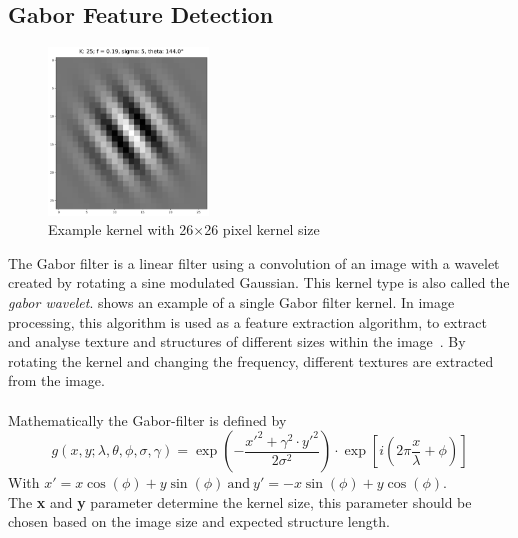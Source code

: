 \documentclass[12pt,a4paper, english,twoside]{scrartcl}
\begin{document}
    \subsection{Gabor Feature Detection}\label{sec:gabor}
      \begin{figure}
      \vspace{-1cm}
       \begin{center}
         \includegraphics[width=0.38\textwidth]{img/KLarge.png}
       \end{center}
       \caption{Example kernel with 26$\times$26 pixel kernel size}\label{fig:largeKernel}
      \end{figure}
      The Gabor filter is a linear filter using a convolution of an image with a wavelet created by rotating a sine modulated Gaussian. 
      This kernel type is also called the \textit{gabor wavelet}.
       shows an example of a single Gabor filter kernel.
      In image processing, this algorithm is used as a feature extraction algorithm, to extract and analyse texture and structures of different sizes within the image~\autocite{Cerdan1993}. 
      By rotating the kernel and changing the frequency, different textures are extracted from the image.\\ \\ 
      \vspace{-0.05cm}
      Mathematically the Gabor-filter is defined by
      \begin{equation}
        g(x,y; \lambda, \theta, \phi, \sigma, \gamma) = \exp \left(- \frac{x'^2 + \gamma^2\cdot y'^2}{2\sigma^2}\right) \cdot \exp \left[i \left(2\pi\frac{x}{\lambda} + \phi \right)\right] 
      \end{equation}
      With $ x' = x \cos(\phi) + y \sin(\phi)~\text{and}~y' = -x \sin(\phi) + y \cos(\phi)$.\\ 
      The \textbf{x} and \textbf{y} parameter determine the kernel size, this parameter should be chosen based on the image size and expected structure length.\\
\end{document}
